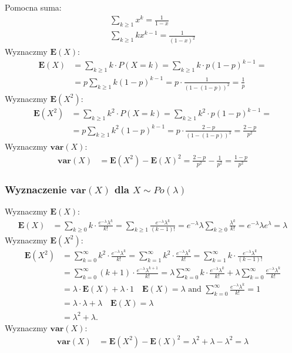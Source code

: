 \documentclass{article}
\begin{document}
Pomocna suma:
\begin{align}
    \sum_{k\geq 1} x^k = \frac{1}{1-x} \\
    \sum_{k\geq 1} kx^{k-1} = \frac{1}{(1-x)^2}
\end{align}
Wyznaczmy $\mathbf{E}(X)$:
\begin{align}
    \mathbf{E}(X) &= \sum_{k\geq 1} k\cdot P(X=k)
    = \sum_{k\geq 1} k\cdot p(1-p)^{k-1} =\\
    &= p\sum_{k\geq 1} k(1-p)^{k-1}
    =p\cdot\frac{1}{(1-(1-p))^2}
    = \frac{1}{p}
\end{align}
Wyznaczmy $\mathbf{E}(X^2)$:
\begin{align}
    \mathbf{E}(X^2) &= \sum_{k\geq 1} k^2\cdot P(X=k)
    = \sum_{k\geq 1} k^2\cdot p(1-p)^{k-1} =\\
    &= p\sum_{k\geq 1} k^2(1-p)^{k-1}
    = p\cdot\frac{2-p}{(1-(1-p))^3}
    = \frac{2-p}{p^2}
\end{align}
Wyznaczmy $\mathbf{var}(X)$:
\begin{align}
    \mathbf{var}(X) &= \mathbf{E}(X^2) - \mathbf{E}(X)^2
    = \frac{2-p}{p^2} - \frac{1}{p^2}
    = \frac{1-p}{p^2}
\end{align}

\subsubsection*{Wyznaczenie $\mathbf{var}(X)$ dla $X\sim Po(\lambda)$}

Wyznaczmy $\mathbf{E}(X)$:
\begin{align}
    \mathbf{E}(X) &= \sum_{k\geq 0} k\cdot \frac{e^{-\lambda}\lambda^k}{k!}
    = \sum_{k\geq 1} \frac{e^{-\lambda}\lambda^k}{(k-1)!}
    = e^{-\lambda}\lambda\sum_{k\geq 0} \frac{\lambda^{k}}{k!}
    = e^{-\lambda}\lambda e^{\lambda}
    = \lambda
\end{align}
Wyznaczmy $\mathbf{E}(X^2)$:
\begin{align}
    \mathbf{E}(X^2) &= \sum_{k=0}^\infty k^2 \cdot \frac{e^{-\lambda}\lambda^k}{k!}
    = \sum_{k=1}^\infty k^2 \cdot \frac{e^{-\lambda}\lambda^k}{k!}
    = \sum_{k=1}^\infty k \cdot \frac{e^{-\lambda}\lambda^k}{(k-1)!} \\
    &= \sum_{k=0}^\infty (k+1) \cdot \frac{e^{-\lambda}\lambda^{k+1}}{k!}
    = \lambda \sum_{k=0}^\infty k \cdot \frac{e^{-\lambda}\lambda^k}{k!} + \lambda \sum_{k=0}^\infty \frac{e^{-\lambda}\lambda^k}{k!} \\
    &= \lambda \cdot \mathbf{E}(X) + \lambda \cdot 1 \quad \mathbf{E}(X) = \lambda \text{ and } \sum_{k=0}^\infty \frac{e^{-\lambda}\lambda^k}{k!} = 1 \\
    &= \lambda \cdot \lambda + \lambda \quad \mathbf{E}(X) = \lambda \\
    &= \lambda^2 + \lambda.
\end{align}
Wyznaczmy $\mathbf{var}(X)$:
\begin{align}
    \mathbf{var}(X) &= \mathbf{E}(X^2) - \mathbf{E}(X)^2 
    = \lambda^2 + \lambda - \lambda^2 
    = \lambda
\end{align}
\end{document}
